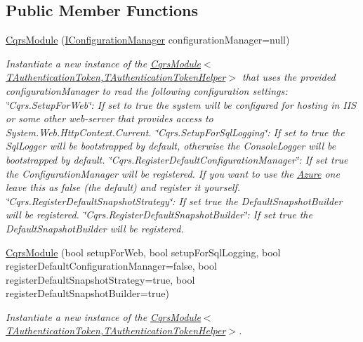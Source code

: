 \subsection*{Public Member Functions}
\begin{DoxyCompactItemize}
\item 
\hyperlink{classCqrs_1_1Ninject_1_1Configuration_1_1CqrsModule_a31a1047d3940842b760ad2a796aa1606_a31a1047d3940842b760ad2a796aa1606}{Cqrs\+Module} (\hyperlink{interfaceCqrs_1_1Configuration_1_1IConfigurationManager}{I\+Configuration\+Manager} configuration\+Manager=null)
\begin{DoxyCompactList}\small\item\em Instantiate a new instance of the \hyperlink{classCqrs_1_1Ninject_1_1Configuration_1_1CqrsModule_a31a1047d3940842b760ad2a796aa1606_a31a1047d3940842b760ad2a796aa1606}{Cqrs\+Module$<$\+T\+Authentication\+Token,\+T\+Authentication\+Token\+Helper$>$} that uses the provided {\itshape configuration\+Manager}  to read the following configuration settings\+: \char`\"{}\+Cqrs.\+Setup\+For\+Web\char`\"{}\+: If set to true the system will be configured for hosting in I\+IS or some other web-\/server that provides access to System.\+Web.\+Http\+Context.\+Current. \char`\"{}\+Cqrs.\+Setup\+For\+Sql\+Logging\char`\"{}\+: If set to true the Sql\+Logger will be bootstrapped by default, otherwise the Console\+Logger will be bootstrapped by default. \char`\"{}\+Cqrs.\+Register\+Default\+Configuration\+Manager\char`\"{}\+: If set true the Configuration\+Manager will be registered. If you want to use the \hyperlink{namespaceCqrs_1_1Ninject_1_1Azure}{Azure} one leave this as false (the default) and register it yourself. \char`\"{}\+Cqrs.\+Register\+Default\+Snapshot\+Strategy\char`\"{}\+: If set true the Default\+Snapshot\+Builder will be registered. \char`\"{}\+Cqrs.\+Register\+Default\+Snapshot\+Builder\char`\"{}\+: If set true the Default\+Snapshot\+Builder will be registered. \end{DoxyCompactList}\item 
\hyperlink{classCqrs_1_1Ninject_1_1Configuration_1_1CqrsModule_a6ab750b5adea25eb8e2f0107fdfc9a47_a6ab750b5adea25eb8e2f0107fdfc9a47}{Cqrs\+Module} (bool setup\+For\+Web, bool setup\+For\+Sql\+Logging, bool register\+Default\+Configuration\+Manager=false, bool register\+Default\+Snapshot\+Strategy=true, bool register\+Default\+Snapshot\+Builder=true)
\begin{DoxyCompactList}\small\item\em Instantiate a new instance of the \hyperlink{classCqrs_1_1Ninject_1_1Configuration_1_1CqrsModule_a31a1047d3940842b760ad2a796aa1606_a31a1047d3940842b760ad2a796aa1606}{Cqrs\+Module$<$\+T\+Authentication\+Token,\+T\+Authentication\+Token\+Helper$>$}. \end{DoxyCompactList}\item 

\end{DoxyCompactItemize}
